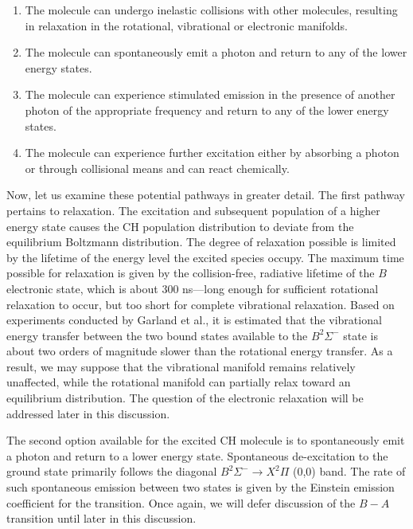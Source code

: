 \begin{enumerate}
  \item The molecule can undergo inelastic collisions with other molecules, resulting in relaxation in the rotational, vibrational or electronic manifolds.
  \item The molecule can spontaneously emit a photon and return to any of the lower energy states.
  \item The molecule can experience stimulated emission in the presence of another photon of the appropriate frequency and return to any of the lower energy states.
  \item The molecule can experience further excitation either by absorbing a photon or through collisional means and can react chemically.
\end{enumerate}

Now, let us examine these potential pathways in greater detail.
The first pathway pertains to relaxation.
The excitation and subsequent population of a higher energy state causes the CH population distribution to deviate from the equilibrium Boltzmann distribution.
The degree of relaxation possible is limited by the lifetime of the energy level the excited species occupy. 
The maximum time possible for relaxation is given by the collision-free, radiative lifetime of the \(B\) electronic state, which is about 300 ns\cite{1996-luque-c}---long enough for sufficient rotational relaxation to occur, but too short for complete vibrational relaxation.
Based on experiments conducted by Garland et al.\cite{1985-garland-b}, it is estimated that the vibrational energy transfer between the two bound states available to the \(B^2\Sigma^-\) state is about two orders of magnitude slower than the rotational energy transfer.
As a result, we may suppose that the vibrational manifold remains relatively unaffected, while the rotational manifold can partially relax toward an equilibrium distribution.
The question of the electronic relaxation will be addressed later in this discussion.

The second option available for the excited CH molecule is to spontaneously emit a photon and return to a lower energy state.
Spontaneous de-excitation to the ground state primarily follows the diagonal \(B^2\Sigma^-\rightarrow X^2\Pi\) (0,0) band.
The rate of such spontaneous emission between two states is given by the Einstein emission coefficient for the transition.
Once again, we will defer discussion of the \(B-A\) transition until later in this discussion.

